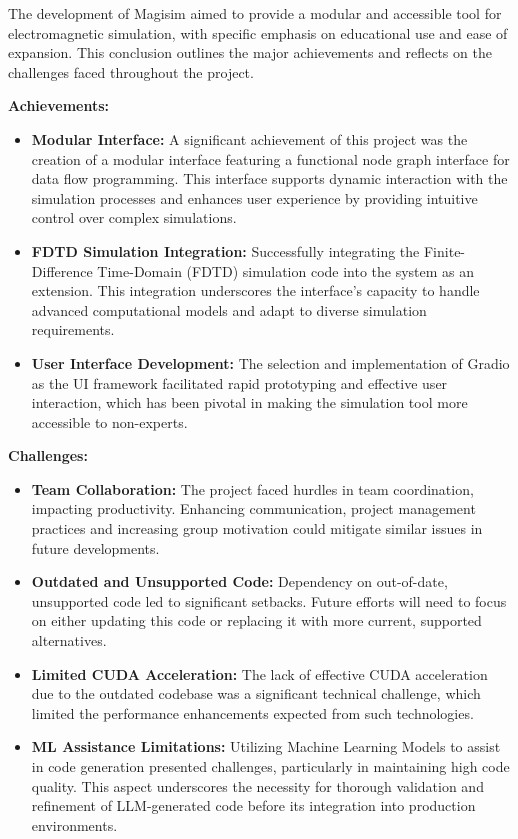 \documentclass[11pt, a4paper, titlepage]{article}
\begin{document}
The development of Magisim aimed to provide a modular and accessible tool for electromagnetic simulation, with specific emphasis on educational use and ease of expansion. This conclusion outlines the major achievements and reflects on the challenges faced throughout the project.

\textbf{Achievements:}
\begin{itemize}
	\item \textbf{Modular Interface:} A significant achievement of this project was the creation of a modular interface featuring a functional node graph interface for data flow programming. This interface supports dynamic interaction with the simulation processes and enhances user experience by providing intuitive control over complex simulations.
	\item \textbf{FDTD Simulation Integration:} Successfully integrating the Finite-Difference Time-Domain (FDTD) simulation code into the system as an extension. This integration underscores the interface’s capacity to handle advanced computational models and adapt to diverse simulation requirements.
	\item \textbf{User Interface Development:} The selection and implementation of Gradio as the UI framework facilitated rapid prototyping and effective user interaction, which has been pivotal in making the simulation tool more accessible to non-experts.
\end{itemize}

\textbf{Challenges:}
\begin{itemize}
	\item \textbf{Team Collaboration:} The project faced hurdles in team coordination, impacting productivity. Enhancing communication, project management practices and increasing group motivation could mitigate similar issues in future developments.
	\item \textbf{Outdated and Unsupported Code:} Dependency on out-of-date, unsupported code led to significant setbacks. Future efforts will need to focus on either updating this code or replacing it with more current, supported alternatives.
	\item \textbf{Limited CUDA Acceleration:} The lack of effective CUDA acceleration due to the outdated codebase was a significant technical challenge, which limited the performance enhancements expected from such technologies.
	\item \textbf{ML Assistance Limitations:} Utilizing Machine Learning Models to assist in code generation presented challenges, particularly in maintaining high code quality. This aspect underscores the necessity for thorough validation and refinement of LLM-generated code before its integration into production environments.
\end{itemize}
\end{document}
